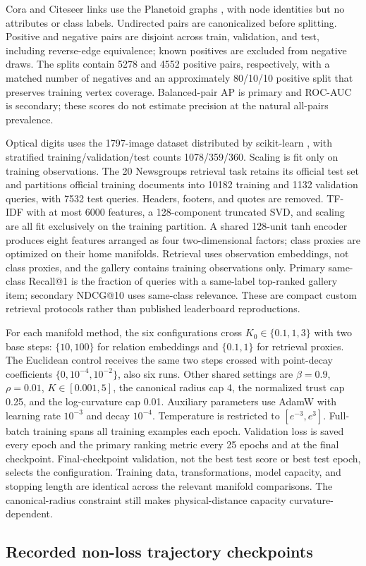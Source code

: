 Cora and Citeseer links use the Planetoid graphs \citep{planetoiddata}, with node identities but no attributes or class labels. Undirected pairs are canonicalized before splitting. Positive and negative pairs are disjoint across train, validation, and test, including reverse-edge equivalence; known positives are excluded from negative draws. The splits contain 5278 and 4552 positive pairs, respectively, with a matched number of negatives and an approximately 80/10/10 positive split that preserves training vertex coverage. Balanced-pair AP is primary and ROC-AUC is secondary; these scores do not estimate precision at the natural all-pairs prevalence.

Optical digits uses the 1797-image dataset distributed by scikit-learn \citep{sklearndigits}, with stratified training/validation/test counts 1078/359/360. Scaling is fit only on training observations. The 20 Newsgroups retrieval task \citep{sklearn20news} retains its official test set and partitions official training documents into 10182 training and 1132 validation queries, with 7532 test queries. Headers, footers, and quotes are removed. TF-IDF with at most 6000 features, a 128-component truncated SVD, and scaling are all fit exclusively on the training partition. A shared 128-unit tanh encoder produces eight features arranged as four two-dimensional factors; class proxies are optimized on their home manifolds. Retrieval uses observation embeddings, not class proxies, and the gallery contains training observations only. Primary same-class Recall@1 is the fraction of queries with a same-label top-ranked gallery item; secondary NDCG@10 uses same-class relevance. These are compact custom retrieval protocols rather than published leaderboard reproductions.

For each manifold method, the six configurations cross $K_0\in\{0.1,1,3\}$ with two base steps: $\{10,100\}$ for relation embeddings and $\{0.1,1\}$ for retrieval proxies. The Euclidean control receives the same two steps crossed with point-decay coefficients $\{0,10^{-4},10^{-2}\}$, also six runs. Other shared settings are $\beta=0.9$, $\rho=0.01$, $K\in[0.001,5]$, the canonical radius cap 4, the normalized trust cap 0.25, and the log-curvature cap 0.01. Auxiliary parameters use AdamW with learning rate $10^{-3}$ and decay $10^{-4}$. Temperature is restricted to $[e^{-3},e^3]$. Full-batch training spans all training examples each epoch. Validation loss is saved every epoch and the primary ranking metric every 25 epochs and at the final checkpoint. Final-checkpoint validation, not the best test score or best test epoch, selects the configuration. Training data, transformations, model capacity, and stopping length are identical across the relevant manifold comparisons. The canonical-radius constraint still makes physical-distance capacity curvature-dependent.




\FloatBarrier
\subsection{Recorded non-loss trajectory checkpoints}


